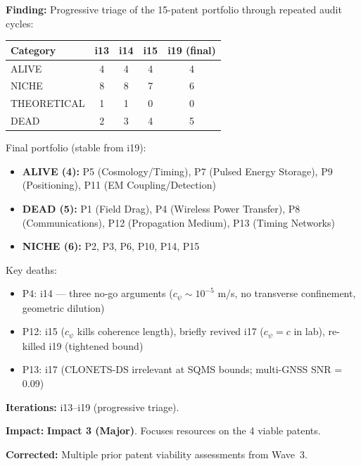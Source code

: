 \documentclass[11pt,a4paper]{article}
\newcommand{\impthree}{\textcolor{impact3}{\textbf{Impact 3 (Major)}}}
\begin{document}
\begin{tcolorbox}[colback=orange!5!white, colframe=orange!70!black,
  title=\textbf{Patent Portfolio Triage --- Iterations 13--19}]

\textbf{Finding:} Progressive triage of the 15-patent portfolio through
repeated audit cycles:

\begin{center}
\begin{tabular}{lcccc}
\toprule
\textbf{Category} & \textbf{i13} & \textbf{i14} & \textbf{i15} & \textbf{i19 (final)} \\
\midrule
ALIVE & 4 & 4 & 4 & 4 \\
NICHE & 8 & 8 & 7 & 6 \\
THEORETICAL & 1 & 1 & 0 & 0 \\
DEAD & 2 & 3 & 4 & 5 \\
\bottomrule
\end{tabular}
\end{center}

Final portfolio (stable from i19):
\begin{itemize}
  \item \textbf{ALIVE (4):} P5 (Cosmology/Timing), P7 (Pulsed Energy
    Storage), P9 (Positioning), P11 (EM Coupling/Detection)
  \item \textbf{DEAD (5):} P1 (Field Drag), P4 (Wireless Power Transfer),
    P8 (Communications), P12 (Propagation Medium), P13 (Timing Networks)
  \item \textbf{NICHE (6):} P2, P3, P6, P10, P14, P15
\end{itemize}

Key deaths:
\begin{itemize}
  \item P4: i14 --- three no-go arguments ($c_\psi \sim 10^{-5}$ m/s,
    no transverse confinement, geometric dilution)
  \item P12: i15 ($c_\psi$ kills coherence length), briefly revived i17
    ($c_\psi = c$ in lab), re-killed i19 (tightened bound)
  \item P13: i17 (CLONETS-DS irrelevant at SQMS bounds; multi-GNSS
    SNR = 0.09)
\end{itemize}

\textbf{Iterations:} i13--i19 (progressive triage).

\textbf{Impact:} \impthree. Focuses resources on the 4 viable patents.

\textbf{Corrected:} Multiple prior patent viability assessments from
Wave~3.

\end{tcolorbox}
\end{document}
